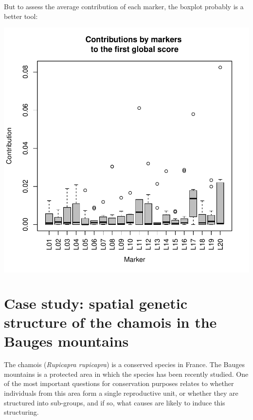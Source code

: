 \documentclass{article}
\begin{document}
But to assess the average contribution of each marker, the
boxplot probably is a better tool:
\begin{Schunk}
\end{Schunk}
\includegraphics{spca-boxplot}











\section{Case study: spatial genetic structure of the chamois in the Bauges mountains}
The chamois (\textit{Rupicapra rupicapra}) is a conserved species in France.
The Bauges mountains is a protected area in which the species has been
recently studied.
One of the most important questions for conservation purposes relates to whether individuals
from this area form a single reproductive unit, or whether they
are structured into sub-groups, and if so, what causes are likely to
induce this structuring.
\end{document}
